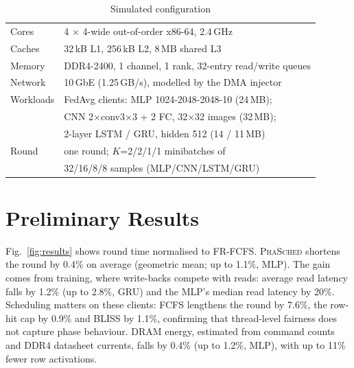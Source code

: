 \documentclass[conference]{IEEEtran}
\newcommand{\name}{\textsc{PhaSched}}
\begin{document}
\begin{table}[t]
\centering
\caption{Simulated configuration}
\label{tab:config}
\footnotesize
\begin{tabular}{@{}ll@{}}
\toprule
Cores & 4 $\times$ 4-wide out-of-order x86-64, 2.4\,GHz \\
Caches & 32\,kB L1, 256\,kB L2, 8\,MB shared L3 \\
Memory & DDR4-2400, 1 channel, 1 rank, 32-entry read/write queues \\
Network & 10\,GbE (1.25\,GB/s), modelled by the DMA injector \\
Workloads & FedAvg clients: MLP 1024-2048-2048-10 (24\,MB); \\
 & CNN 2$\times$conv3$\times$3 + 2 FC, 32$\times$32 images (32\,MB); \\
 & 2-layer LSTM / GRU, hidden 512 (14 / 11\,MB) \\
Round & one round; $K$=2/2/1/1 minibatches of \\
 & 32/16/8/8 samples (MLP/CNN/LSTM/GRU) \\
\bottomrule
\end{tabular}
\end{table}

\section{Preliminary Results}
Fig.~\ref{fig:results} shows round time normalised to FR-FCFS. \name{} shortens the round by 0.4\% on average (geometric mean; up to 1.1\%, MLP). The gain comes from training, where write-backs compete with reads: average read latency falls by 1.2\% (up to 2.8\%, GRU) and the MLP's median read latency by 20\%. Scheduling matters on these clients: FCFS lengthens the round by 7.6\%, the row-hit cap by 0.9\% and BLISS by 1.1\%, confirming that thread-level fairness does not capture phase behaviour. DRAM energy, estimated from command counts and DDR4 datasheet currents, falls by 0.4\% (up to 1.2\%, MLP), with up to 11\% fewer row activations.
\end{document}
